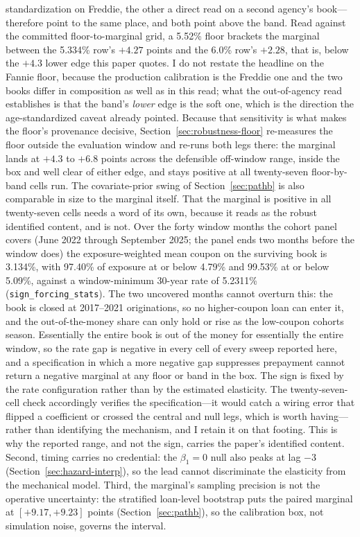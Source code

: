 \documentclass[12pt]{article}
\begin{document}
standardization on Freddie, the other a direct read on a second agency's book---therefore point to the same place, and both point above the band. Read against the committed floor-to-marginal grid, a 5.52\% floor brackets the marginal between the 5.334\% row's $+4.27$ points and the 6.0\% row's $+2.28$, that is, below the $+4.3$ lower edge this paper quotes. I do not restate the headline on the Fannie floor, because the production calibration is the Freddie one and the two books differ in composition as well as in this read; what the out-of-agency read establishes is that the band's \emph{lower} edge is the soft one, which is the direction the age-standardized caveat already pointed. Because that sensitivity is what makes the floor's provenance decisive, Section~\ref{sec:robustness-floor} re-measures the floor outside the evaluation window and re-runs both legs there: the marginal lands at $+4.3$ to $+6.8$ points across the defensible off-window range, inside the box and well clear of either edge, and stays positive at all twenty-seven floor-by-band cells run. The covariate-prior swing of Section~\ref{sec:pathb} is also comparable in size to the marginal itself. That the marginal is positive in all twenty-seven cells needs a word of its own, because it reads as the robust identified content, and is not. Over the forty window months the cohort panel covers (June 2022 through September 2025; the panel ends two months before the window does) the exposure-weighted mean coupon on the surviving book is 3.134\%, with 97.40\% of exposure at or below 4.79\% and 99.53\% at or below 5.09\%, against a window-minimum 30-year rate of 5.2311\% (\texttt{sign\_forcing\_stats}). The two uncovered months cannot overturn this: the book is closed at 2017--2021 originations, so no higher-coupon loan can enter it, and the out-of-the-money share can only hold or rise as the low-coupon cohorts season. Essentially the entire book is out of the money for essentially the entire window, so the rate gap is negative in every cell of every sweep reported here, and a specification in which a more negative gap suppresses prepayment cannot return a negative marginal at any floor or band in the box. The sign is fixed by the rate configuration rather than by the estimated elasticity. The twenty-seven-cell check accordingly verifies the specification---it would catch a wiring error that flipped a coefficient or crossed the central and null legs, which is worth having---rather than identifying the mechanism, and I retain it on that footing. This is why the reported range, and not the sign, carries the paper's identified content. Second, timing carries no credential: the $\beta_1 = 0$ null also peaks at lag $-3$ (Section~\ref{sec:hazard-interp}), so the lead cannot discriminate the elasticity from the mechanical model. Third, the marginal's sampling precision is not the operative uncertainty: the stratified loan-level bootstrap puts the paired marginal at $[+9.17, +9.23]$ points (Section~\ref{sec:pathb}), so the calibration box, not simulation noise, governs the interval.
\end{document}
